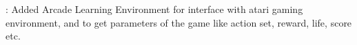 \documentclass[12pt]{article}
\begin{document}
		 






 : Added Arcade Learning Environment for interface with atari gaming environment, and to get parameters of the game like action set, reward, life, score etc.
\end{document}

